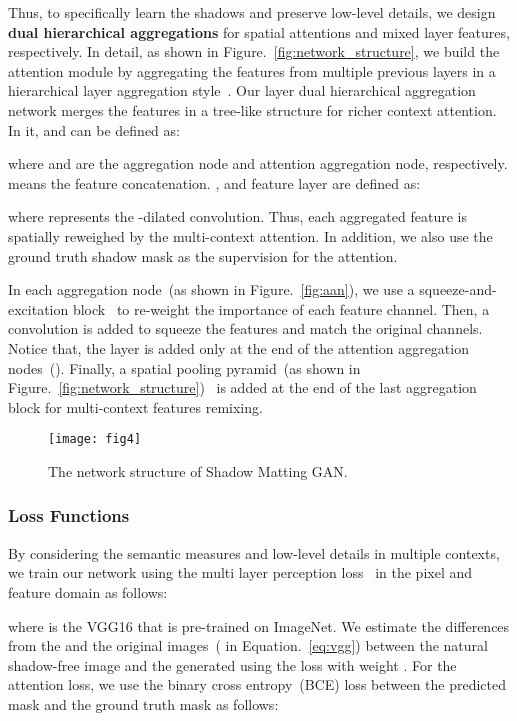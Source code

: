 \documentclass[letterpaper]{article} \usepackage{aaai20}  \usepackage{times}  \usepackage{helvet} \usepackage{courier}  \usepackage[hyphens]{url}  \urlstyle{rm} \def\UrlFont{\rm}  \usepackage{graphicx}  \frenchspacing  \setlength{\pdfpagewidth}{8.5in}  \setlength{\pdfpageheight}{11in}  \usepackage{amssymb}
\begin{document}
Thus, to specifically learn the shadows and preserve low-level details, we design \textbf{dual hierarchical aggregations} for spatial attentions and mixed layer features, respectively. In detail, as shown in Figure.~\ref{fig:network_structure}, we build the attention module by aggregating the features from multiple previous layers in a hierarchical layer aggregation style~\cite{Yu:2017ts}. Our  layer dual hierarchical aggregation network  merges the features in a tree-like structure for richer context attention. In it,  and  can be defined as:

where  and  are the aggregation node and attention aggregation node, respectively.  means the feature concatenation. ,  and feature layer  are defined as:

where  represents the -dilated convolution.  
Thus, each aggregated feature is spatially reweighed by the multi-context attention. In addition, we also use the ground truth shadow mask as the supervision for the attention. 

In each aggregation node~(as shown in Figure.~\ref{fig:aan}), we use a squeeze-and-excitation block~\cite{hu2018squeeze} to re-weight the importance of each feature channel. Then, a  convolution is added to squeeze the features and match the original channels. Notice that, the  layer is added only at the end of the attention aggregation nodes~(). Finally, a spatial pooling pyramid~(as shown in Figure.~\ref{fig:network_structure})~\cite{he2015spatial} is added at the end of the last aggregation block for multi-context features remixing.

\begin{figure*}[h]
	\centering
  \texttt{[image: fig4]}
  \caption{The network structure of Shadow Matting GAN.}
  \label{fig:shadowbank}
\end{figure*}

\subsubsection{Loss Functions}
By considering the semantic measures and low-level details in multiple contexts, we train our network using the multi layer perception loss~\cite{2018arXiv180605376Z,johnson2016perceptual}  in the pixel and feature domain as follows: 

where  is the VGG16 that is pre-trained on ImageNet. We estimate the differences from the  and the original images~( in Equation.~\ref{eq:vgg}) between the natural shadow-free image  and the generated  using the  loss with weight . For the attention loss, we use the binary cross entropy~(BCE) loss between the predicted mask  and the ground truth mask  as follows:
\end{document}
